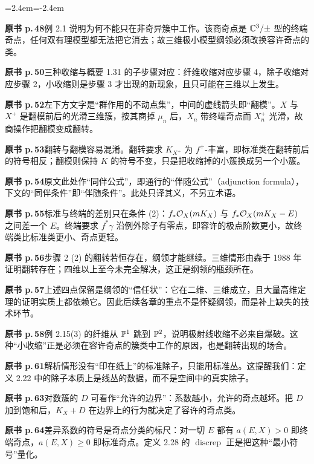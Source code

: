 \begin{list}{}{\leftmargin=2.4em\itemindent=-2.4em\itemsep=2pt\parsep=0pt}
\item \textbf{原书 p.\,48}\quad 例 2.1 说明为何不能只在非奇异簇中工作。该商奇点是 $\mathbb{C}^3/\pm$ 型的终端奇点，任何双有理模型都无法把它消去；故三维极小模型纲领必须改换容许奇点的类。
\item \textbf{原书 p.\,50}\quad 三种收缩与概要 1.31 的子步骤对应：纤维收缩对应步骤 4，除子收缩对应步骤 2，小收缩则是步骤 3 才出现的新现象，且只可能在三维以上发生。
\item \textbf{原书 p.\,52}\quad 左下方文字是“群作用的不动点集”，中间的虚线箭头即“翻模”。$X$ 与 $X^+$ 是翻模前后的光滑三维簇，按其商掉 $\mu_n$ 后，$X_n$ 带终端奇点而 $X^+_n$ 光滑，故商操作把翻模变成翻转。
\item \textbf{原书 p.\,53}\quad 翻转与翻模容易混淆。翻转要求 $K_{X^+}$ 为 $f^+$-丰富，即标准类在翻转前后的符号相反；翻模则保持 $K$ 的符号不变，只是把收缩掉的小簇换成另一个小簇。
\item \textbf{原书 p.\,54}\quad 原文此处作“同伴公式”，即通行的“伴随公式”（adjunction formula），下文的“同伴条件”即“伴随条件”。此处只译其义，不另立术语。
\item \textbf{原书 p.\,55}\quad 标准与终端的差别只在条件 (2)：$f_*\mathcal{O}_X(mK_X)$ 与 $f_*\mathcal{O}_X(mK_X-E)$ 之间差一个 $E$。终端要求 $f^*\gamma$ 沿例外除子有零点，即容许的极点阶数更小，故终端类比标准类更小、奇点更轻。
\item \textbf{原书 p.\,56}\quad 步骤 2 (2) 的翻转若恒存在，纲领才能继续。三维情形由森于 1988 年证明翻转存在；四维以上至今未完全解决，这正是纲领的瓶颈所在。
\item \textbf{原书 p.\,57}\quad 上述四点保留是纲领的“信任状”：它在二维、三维成立，且大量高维定理的证明实质上都依赖它。因此后续各章的重点不是怀疑纲领，而是补上缺失的技术环节。
\item \textbf{原书 p.\,58}\quad 例 2.15(3) 的纤维从 $\mathbb{P}^1$ 跳到 $\mathbb{P}^2$，说明极射线收缩不必来自爆破。这种“小收缩”正是必须在容许奇点的簇类中工作的原因，也是翻转出现的场合。
\item \textbf{原书 p.\,61}\quad 解析情形没有“印在纸上”的标准除子，只能用标准丛。这提醒我们：定义 2.22 中的除子本质上是线丛的数据，而不是空间中的真实除子。
\item \textbf{原书 p.\,63}\quad 对数簇的 $D$ 可看作“允许的边界”：系数越小，允许的奇点越坏。把 $D$ 加到饱和后，$K_X+D$ 在边界上的行为就决定了容许的奇点类。
\item \textbf{原书 p.\,64}\quad 差异系数的符号是奇点分类的标尺：对一切 $E$ 都有 $a(E,X)>0$ 即终端奇点，$a(E,X)\ge0$ 即标准奇点。定义 2.28 的 $\operatorname{discrep}$ 正是把这种“最小符号”量化。

\end{list}

